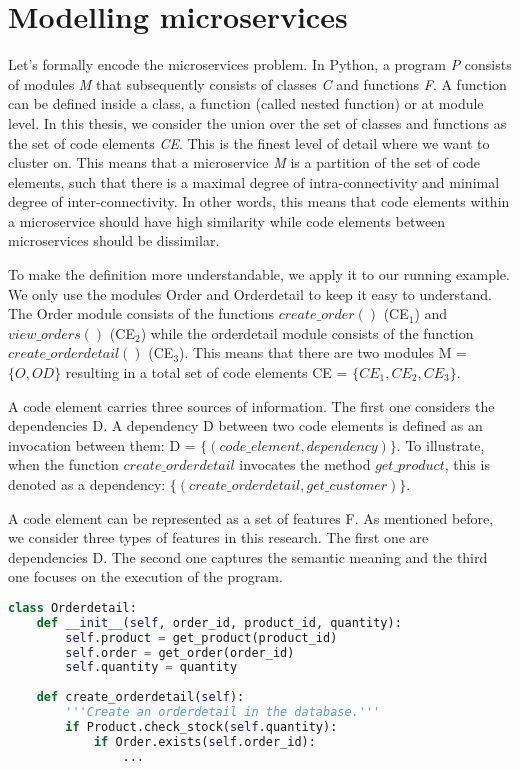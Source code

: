 \section{Modelling microservices}

Let's formally encode the microservices problem. In Python, a program \textit{P} consists of modules \textit{M} that subsequently consists of classes \textit{C} and functions \textit{F}. A function can be defined inside a class, a function (called nested function) or at module level. In this thesis, we consider the union over the set of classes and functions as the set of code elements \textit{CE}. This is the finest level of detail where we want to cluster on. This means that a microservice \textit{M} is a partition of the set of code elements, such that there is a maximal degree of intra-connectivity and minimal degree of inter-connectivity. In other words, this means that code elements within a microservice should have high similarity while code elements between microservices should be dissimilar.\par

To make the definition more understandable, we apply it to our running example. We only use the modules Order and Orderdetail to keep it easy to understand. The Order module consists of the functions $create\_order()$ (CE$_{1}$) and $view\_orders()$ (CE$_2$) while the orderdetail module consists of the function $create\_orderdetail()$ (CE$_3$). This means that there are two modules M = $\{O, OD\}$ resulting in a total set of  code elements CE = $\{CE_1, CE_2, CE_3\}$.

A code element carries three sources of information. The first one considers the dependencies D. A dependency D between two code elements is defined as an invocation between them: D = $\{(code\_element, dependency)\}$. To illustrate, when the function $create\_orderdetail$ invocates the method $get\_product$, this is denoted as a dependency: $\{(create\_orderdetail, get\_customer)\}$.\par
A code element can be represented as a set of features F. As mentioned before, we consider three types of features in this research. The first one are dependencies D. The second one captures the semantic meaning and the third one focuses on the execution of the program.

\begin{lstlisting}[language=Python, caption=Python example]
class Orderdetail:
    def __init__(self, order_id, product_id, quantity):
        self.product = get_product(product_id)
        self.order = get_order(order_id)
        self.quantity = quantity
    
    def create_orderdetail(self):
        '''Create an orderdetail in the database.'''
        if Product.check_stock(self.quantity):
            if Order.exists(self.order_id):
                ...
\end{lstlisting}

